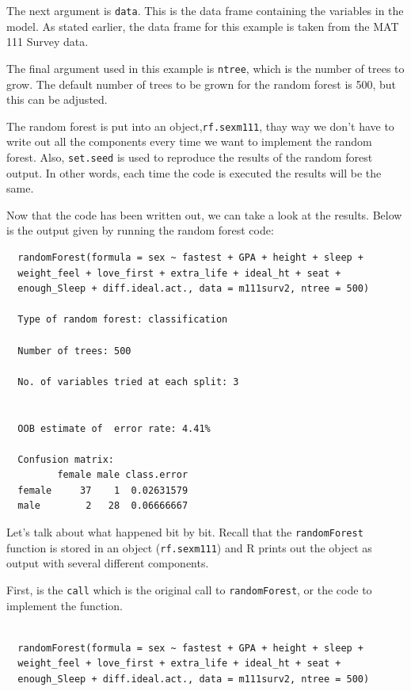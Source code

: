 \documentclass[12pt,twoside]{reedthesis}
\begin{document}
  The next argument is \texttt{data}. This is the data frame containing
  the variables in the model. As stated earlier, the data frame for this
  example is taken from the MAT 111 Survey data.
  
  The final argument used in this example is \texttt{ntree}, which is the
  number of trees to grow. The default number of trees to be grown for the
  random forest is 500, but this can be adjusted.
  
  The random forest is put into an object,\texttt{rf.sexm111}, thay way we
  don't have to write out all the components every time we want to
  implement the random forest. Also, \texttt{set.seed} is used to
  reproduce the results of the random forest output. In other words, each
  time the code is executed the results will be the same.
  
  \newpage
  
  Now that the code has been written out, we can take a look at the
  results. Below is the output given by running the random forest code:
  
  \begin{verbatim}
  randomForest(formula = sex ~ fastest + GPA + height + sleep +      
  weight_feel + love_first + extra_life + ideal_ht + seat +      
  enough_Sleep + diff.ideal.act., data = m111surv2, ntree = 500) 
                 
  Type of random forest: classification
  
  Number of trees: 500
  
  No. of variables tried at each split: 3
  
  
  OOB estimate of  error rate: 4.41%
  
  Confusion matrix:
         female male class.error
  female     37    1  0.02631579
  male        2   28  0.06666667
  \end{verbatim}
  
  Let's talk about what happened bit by bit. Recall that the
  \texttt{randomForest} function is stored in an object
  (\texttt{rf.sexm111}) and R prints out the object as output with several
  different components.
  
  First, is the \texttt{call} which is the original call to
  \texttt{randomForest}, or the code to implement the function.
  
  \begin{verbatim}
  
  randomForest(formula = sex ~ fastest + GPA + height + sleep +      
  weight_feel + love_first + extra_life + ideal_ht + seat +      
  enough_Sleep + diff.ideal.act., data = m111surv2, ntree = 500) 
  \end{verbatim}
  
\end{document}

